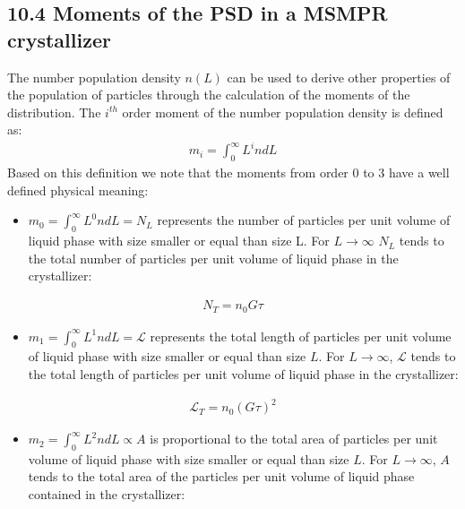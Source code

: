 \documentclass[letterpaper,10pt,english]{jupyterBook}
\begin{document}
\subsection{10.4 Moments of the PSD in a MSMPR crystallizer}
\label{\detokenize{MSMPR_crystallizer:moments-of-the-psd-in-a-msmpr-crystallizer}}
\sphinxAtStartPar
The number population density \(n(L)\) can be used to derive other properties of the population of particles through the calculation of the moments of the distribution.
The \(i^{th}\) order moment of the number population density is defined as:
\begin{equation}\label{equation:MSMPR_crystallizer:MSMPReq12}
\begin{split}
m_i=\int_0^{\infty}L^indL
\end{split}
\end{equation}
\sphinxAtStartPar
Based on this definition we note that the moments from order 0 to 3 have a well defined physical meaning:
\begin{itemize}
\item {} 
\sphinxAtStartPar
\(m_0=\int_0^{\infty}L^0ndL=N_L\) represents the number of particles per unit volume of liquid phase  with size smaller or equal than size L. For \(L\rightarrow{\infty}\) \(N_L\) tends to the total number of particles per unit volume of liquid phase in the crystallizer:

\end{itemize}
\begin{equation}\label{equation:MSMPR_crystallizer:MSMPReq13}
\begin{split}
N_T=n_0G\tau
\end{split}
\end{equation}\begin{itemize}
\item {} 
\sphinxAtStartPar
\(m_1=\int_0^{\infty}L^1ndL=\mathcal{L}\) represents the total length of particles per unit volume of liquid phase with size smaller or equal than size \(L\). For \(L\rightarrow{\infty}\), \(\mathcal{L}\) tends to the total length of particles per unit volume of liquid phase in the crystallizer:

\end{itemize}
\begin{equation}\label{equation:MSMPR_crystallizer:MSMPReq14}
\begin{split}
\mathcal{L}_T=n_0(G\tau)^2
\end{split}
\end{equation}\begin{itemize}
\item {} 
\sphinxAtStartPar
\(m_2=\int_0^{\infty}L^2ndL\propto{A}\) is proportional to the total area of particles per unit volume of liquid phase with size smaller or equal than size \(L\). For \(L\rightarrow{\infty}\), \(A\) tends to the total area of the particles per unit volume of liquid phase contained in the crystallizer:

\end{itemize}
\end{document}
